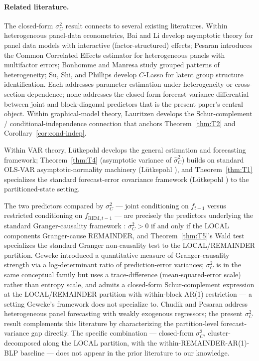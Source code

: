 \documentclass[11pt,letterpaper]{article}
\theoremstyle{remark}
\newcommand{\REM}{\mathrm{REM}}
\begin{document}
\paragraph{Related literature.} The closed-form $\sigma^2_C$ result connects to several existing literatures. Within heterogeneous panel-data econometrics, Bai and Li \cite{BaiLi2014} develop asymptotic theory for panel data models with interactive (factor-structured) effects; Pesaran \cite{Pesaran2006} introduces the Common Correlated Effects estimator for heterogeneous panels with multifactor errors; Bonhomme and Manresa \cite{BonhommeManresa2015} study grouped patterns of heterogeneity; Su, Shi, and Phillips \cite{SuShiPhillips2016} develop $C$-Lasso for latent group structure identification. Each addresses parameter estimation under heterogeneity or cross-section dependence; none addresses the closed-form forecast-variance differential between joint and block-diagonal predictors that is the present paper's central object. Within graphical-model theory, Lauritzen \cite[Ch.~5, esp.\ \S 5.1.3, p.~129]{Lauritzen1996} develops the Schur-complement / conditional-independence connection that anchors Theorem~\ref{thm:T2} and Corollary~\ref{cor:cond-indep}.

Within VAR theory, L\"utkepohl \cite{Lutkepohl2005} develops the general estimation and forecasting framework; Theorem~\ref{thm:T4} (asymptotic variance of $\widehat\sigma^2_C$) builds on standard OLS-VAR asymptotic-normality machinery (L\"utkepohl \cite[Proposition~3.1, p.~74]{Lutkepohl2005}), and Theorem~\ref{thm:T1} specializes the standard forecast-error covariance framework (L\"utkepohl \cite[Ch.~2.2.2, Ch.~3.5]{Lutkepohl2005}) to the partitioned-state setting.

The two predictors compared by $\sigma^2_C$ --- joint conditioning on $f_{t-1}$ versus restricted conditioning on $f_{\REM, t-1}$ --- are precisely the predictors underlying the standard Granger-causality framework \cite[Ch.~2.3, Ch.~7]{Lutkepohl2005}: $\sigma^2_C > 0$ if and only if the LOCAL components Granger-cause REMAINDER, and Theorem~\ref{thm:T5}'s Wald test specializes the standard Granger non-causality test to the LOCAL/REMAINDER partition. Geweke \cite{Geweke1982} introduced a quantitative measure of Granger-causality strength via a log-determinant ratio of prediction-error variances; $\sigma^2_C$ is in the same conceptual family but uses a trace-difference (mean-squared-error scale) rather than entropy scale, and admits a closed-form Schur-complement expression at the LOCAL/REMAINDER partition with within-block AR(1) restriction --- a setting Geweke's framework does not specialize to. Chudik and Pesaran \cite{ChudikPesaran2015} address heterogeneous panel forecasting with weakly exogenous regressors; the present $\sigma^2_C$ result complements this literature by characterizing the partition-level forecast-variance gap directly. The specific combination --- closed-form $\sigma^2_C$, cluster-decomposed along the LOCAL partition, with the within-REMAINDER-AR(1)-BLP baseline --- does not appear in the prior literature to our knowledge.
\end{document}
